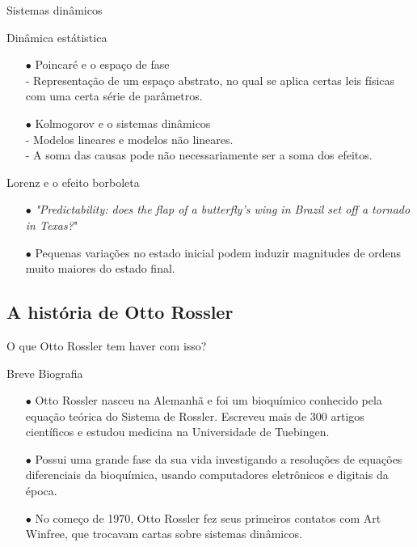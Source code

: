 \documentclass{beamer}
\begin{document}
\begin{frame}{Sistemas dinâmicos}
	\begin{exampleblock}{Dinâmica estátistica}
		\begin{itemize}
			\item [$\bullet$] Poincaré e o espaço de fase
				\\ - Representação de um espaço abstrato, no qual se aplica certas leis físicas com uma certa série de parâmetros.
			\item [$\bullet$] Kolmogorov e o sistemas dinâmicos
				\\ - Modelos lineares e modelos não lineares.
				\\ - A soma das causas pode não necessariamente ser a soma dos efeitos.
		\end{itemize}
	\end{exampleblock}
	
	\begin{exampleblock}{Lorenz e o efeito borboleta}
	\begin{itemize}
		\item [$\bullet$] \textit{"Predictability: does the flap of a butterfly's wing in Brazil set off a tornado in Texas?}"
		\item [$\bullet$] Pequenas variações no estado inicial podem induzir magnitudes de ordens muito maiores do estado final.
	\end{itemize}
	\end{exampleblock}
	\end{frame}

	
\subsection{A história de Otto Rossler}
\begin{frame}{O que Otto Rossler tem haver com isso?}
	
	\begin{exampleblock}{Breve Biografia}
		\begin{itemize}
		\item [$\bullet$] Otto Rossler nasceu na Alemanhã e foi um bioquímico conhecido pela equação teórica do Sistema de Rossler. 
		Escreveu mais de 300 artigos científicos e estudou medicina na Universidade de Tuebingen.
		\item [$\bullet$] Possui uma grande fase da sua vida investigando a resoluções de equações diferenciais da bioquímica, usando computadores eletrônicos e digitais da época.
		
		\item [$\bullet$] No começo de 1970, Otto Rossler fez seus primeiros contatos com Art Winfree, que trocavam cartas sobre sistemas dinâmicos.
		 
		\end{itemize}
	\end{exampleblock}
\end{frame}
\end{document}
